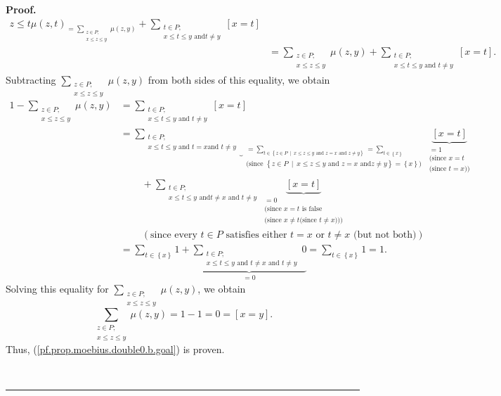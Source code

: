 \documentclass[numbers=enddot,12pt,final,onecolumn,notitlepage]{scrartcl}%
\theoremstyle{definition}
\newenvironment{proof}[1][Proof]{\noindent\textbf{#1.} }{\ \rule{0.5em}{0.5em}}
\newenvironment{verlong}{}{}
\let\sumnonlimits\sum
\renewcommand{\sum}{\sumnonlimits\limits}
\begin{document}
\begin{verlong}
\begin{proof}
\begin{align*}
{{{z\leq t}}\mu\left(  z,t\right)  }_{=\sum_{\substack{z\in P;\\x\leq z\leq
y}}\mu\left(  z,y\right)  }+\sum_{\substack{t\in P;\\x\leq t\leq y\text{ and
}t\neq y}}\left[  x=t\right] \\
&  =\sum_{\substack{z\in P;\\x\leq z\leq y}}\mu\left(  z,y\right)
+\sum_{\substack{t\in P;\\x\leq t\leq y\text{ and }t\neq y}}\left[
x=t\right]  .
\end{align*}
Subtracting $\sum_{\substack{z\in P;\\x\leq z\leq y}}\mu\left(  z,y\right)  $
from both sides of this equality, we obtain%
\begin{align*}
1-\sum_{\substack{z\in P;\\x\leq z\leq y}}\mu\left(  z,y\right)   &
=\sum_{\substack{t\in P;\\x\leq t\leq y\text{ and }t\neq y}}\left[  x=t\right]
\\
&  =\underbrace{\sum_{\substack{t\in P;\\x\leq t\leq y\text{ and }t=x\text{
and }t\neq y}}}_{\substack{=\sum_{t\in\left\{  z\in P\ \mid\ x\leq z\leq
y\text{ and }z=x\text{ and }z\neq y\right\}  }=\sum_{t\in\left\{  x\right\}
}\\\text{(since }\left\{  z\in P\ \mid\ x\leq z\leq y\text{ and }z=x\text{ and
}z\neq y\right\}  =\left\{  x\right\}  \text{)}}}\underbrace{\left[
x=t\right]  }_{\substack{=1\\\text{(since }x=t\\\text{(since }t=x\text{))}}}\\
&  \ \ \ \ \ \ \ \ \ \ +\sum_{\substack{t\in P;\\x\leq t\leq y\text{ and
}t\neq x\text{ and }t\neq y}}\underbrace{\left[  x=t\right]  }%
_{\substack{=0\\\text{(since }x=t\text{ is false}\\\text{(since }x\neq t\text{
(since }t\neq x\text{)))}}}\\
&  \ \ \ \ \ \ \ \ \ \ \left(  \text{since every }t\in P\text{ satisfies
either }t=x\text{ or }t\neq x\text{ (but not both)}\right) \\
&  =\sum_{t\in\left\{  x\right\}  }1+\underbrace{\sum_{\substack{t\in
P;\\x\leq t\leq y\text{ and }t\neq x\text{ and }t\neq y}}0}_{=0}=\sum
_{t\in\left\{  x\right\}  }1=1.
\end{align*}
Solving this equality for $\sum_{\substack{z\in P;\\x\leq z\leq y}}\mu\left(
z,y\right)  $, we obtain%
\[
\sum_{\substack{z\in P;\\x\leq z\leq y}}\mu\left(  z,y\right)  =1-1=0=\left[
x=y\right]  .
\]
Thus, (\ref{pf.prop.moebius.double0.b.goal}) is proven.


\end{proof}
\end{verlong}
\end{document}

